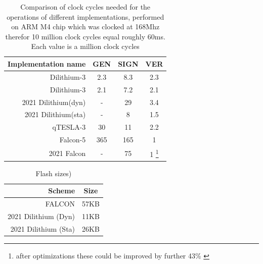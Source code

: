\documentclass[ucs,10pt]{beamer}
\begin{document}
\begin{frame}[allowframebreaks]
\begin{table}%
    \caption{Comparison of clock cycles needed for the operations of different implementations, performed on ARM M4 chip which was clocked at 168Mhz therefor 10 million clock cycles equal roughly 60ms. Each value is a million clock cycles}
    \label{t:clockcycles_comp}
    \centering\begin{tabular}{| r | c c c |}
        \hline
        Implementation name                     & GEN           & SIGN         & VER \\
        \hline
        Dilithium-3 \cite{QR_Iot_Lattice}       & 2.3           & 8.3          & 2.3 \\
        Dilithium-3 \cite{Energy_comp}          & 2.1           & 7.2          & 2.1 \\ %
        2021 Dilithium(dyn)\cite{update_sign}   & -             & 29           & 3.4\\
        2021 Dilithium(sta)\cite{update_sign}   & -             & 8            & 1.5\\
        qTESLA-3 \cite{QR_Iot_Lattice}          & 30            & 11           & 2.2\\
        Falcon-5 \cite{QR_Iot_Lattice}          & 365           & 165          & 1\\
        2021 Falcon  \cite{update_sign}         & -             & 75           & 1 \footnote{after optimizations these could be improved by further 43\% \cite{falcon_micro_impl}}\\
        \hline
    \end{tabular}
    
\end{table}

\begin{table}%
    \caption{Flash sizes)}
    \label{t:flashsize_comp}
    \centering\begin{tabular}{| r | c |}
        \hline
        Scheme & Size \\
        \hline
        FALCON & 57KB \\
        2021 Dilithium (Dyn) & 11KB\\
        2021 Dilithium (Sta) & 26KB\\
        \hline
    \end{tabular}
\end{table}


\end{frame}
\end{document}
